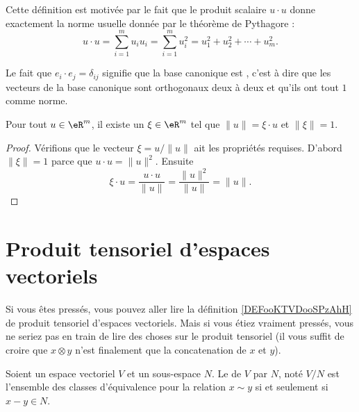 Cette définition est motivée par le fait que le produit scalaire $u\cdot u$ donne exactement la norme usuelle donnée par le théorème de Pythagore :
\begin{equation}
	u\cdot u=\sum_{i=1}^mu_iu_i=\sum_{i=1}^m u_i^2=u_1^2+u_2^2+\cdots+u_m^2.
\end{equation}

Le fait que $e_i\cdot e_j=\delta_{ij}$ signifie que la base canonique est , c'est à dire que les vecteurs de la base canonique sont orthogonaux deux à deux et qu'ils ont tout $1$ comme norme.

\begin{lemma}\label{LemSclNormeXi}
	Pour tout $u\in\eR^m$, il existe un $\xi\in\eR^m$ tel que $\| u \|=\xi\cdot u$ et $\| \xi \|=1$.
\end{lemma}

\begin{proof}
	Vérifions que le vecteur $\xi=u/\| u \|$ ait les propriétés requises. D'abord $\| \xi \|=1$ parce que $u\cdot u=\| u \|^2$. Ensuite
	\begin{equation}
		\xi\cdot u=\frac{ u\cdot u }{ \| u \| }=\frac{ \| u \|^2 }{ \| u \| }=\| u \|.
	\end{equation}
\end{proof}

\section{Produit tensoriel d'espaces vectoriels}

Si vous êtes pressés, vous pouvez aller lire la définition \ref{DEFooKTVDooSPzAhH} de produit tensoriel d'espaces vectoriels. Mais si vous étiez vraiment pressés, vous ne seriez pas en train de lire des choses sur le produit tensoriel (il vous suffit de croire que \( x\otimes y\) n'est finalement que la concatenation de \( x\) et \( y\)).

\begin{definition}
    Soient un espace vectoriel \( V\) et un sous-espace \( N\). Le  de \( V\) par \( N\), noté \( V/N\) est l'ensemble des classes d'équivalence pour la relation \( x\sim y\) si et seulement si \( x-y\in N\).
\end{definition}

